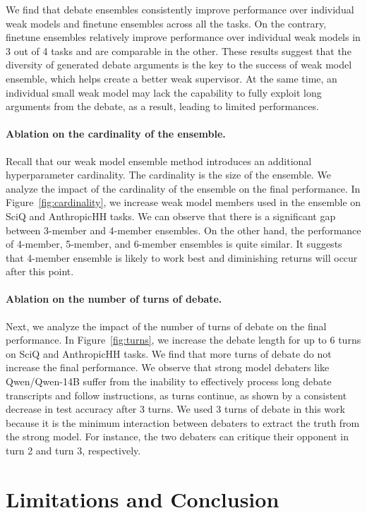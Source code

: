 \documentclass[letterpaper]{article} %
\begin{document}
We find that debate ensembles consistently improve performance over individual weak models and finetune ensembles across all the tasks.
On the contrary, finetune ensembles relatively improve performance over individual weak models in 3 out of 4 tasks and are comparable in the other.
These results suggest that the diversity of generated debate arguments is the key to the success of weak model ensemble, which helps create a better weak supervisor.
At the same time, an individual small weak model may lack the capability to fully exploit long arguments from the debate, as a result, leading to limited performances.

\paragraph{Ablation on the cardinality of the ensemble.} Recall that our weak model ensemble method introduces an additional hyperparameter cardinality.
The cardinality is the size of the ensemble.
We analyze the impact of the cardinality of the ensemble on the final performance.
In Figure~\ref{fig:cardinality}, we increase weak model members used in the ensemble on SciQ and AnthropicHH tasks.
We can observe that there is a significant gap between 3-member and 4-member ensembles.
On the other hand, the performance of 4-member, 5-member, and 6-member ensembles is quite similar.
It suggests that 4-member ensemble is likely to work best and diminishing returns will occur after this point.

\paragraph{Ablation on the number of turns of debate.} Next, we analyze the impact of the number of turns of debate on the final performance.
In Figure~\ref{fig:turns}, we increase the debate length for up to 6 turns on SciQ and AnthropicHH tasks.
We find that more turns of debate do not increase the final performance.
We observe that strong model debaters like Qwen/Qwen-14B suffer from the inability to effectively process long debate transcripts and follow instructions, as turns continue, as shown by a consistent decrease in test accuracy after 3 turns.
We used 3 turns of debate in this work because it is the minimum interaction between debaters to extract the truth from the strong model.
For instance, the two debaters can critique their opponent in turn 2 and turn 3, respectively.

\section{Limitations and Conclusion}
\end{document}
